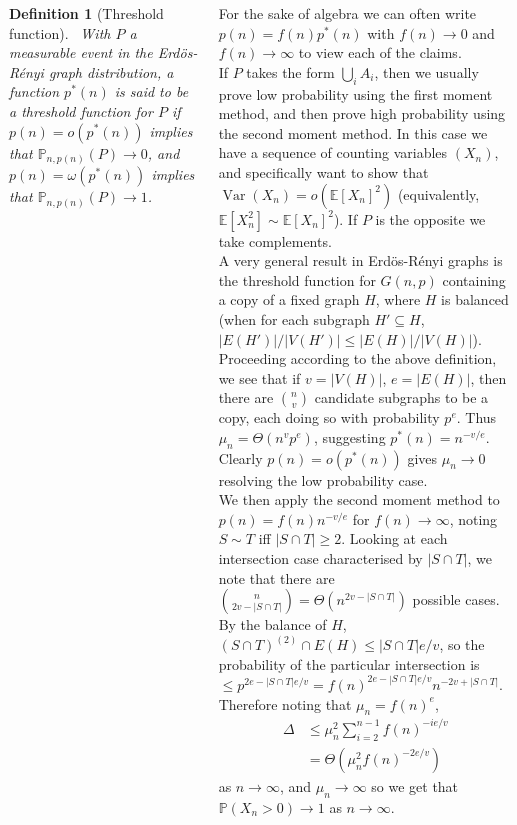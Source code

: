 \documentclass{tikzposter} %
\DeclareMathOperator{\Var}{Var}
\newcommand\Pj{\ensuremath{\mathbb{P}}}
\renewcommand\P[1]{\ensuremath{\mathbb{P}\left(#1\right)}}
\newcommand\E[1]{\ensuremath{\mathbb{E}\left[#1\right]}}
\newtheorem{definition}{Definition}
\begin{document}
\begin{columns}
{    \begin{definition}[Threshold function]
    \ With $P$ a measurable event in the Erd\"os-R\'enyi graph distribution, a function $p^*(n)$ is said to be a threshold function for $P$ if $p(n) = o(p^*(n))$ implies that $\Pj_{n, p(n)}\left(P\right) \to 0$, and $p(n) = \omega(p^*(n))$ implies that $\Pj_{n, p(n)}\left(P\right) \to 1$.
    \end{definition}
    \hphantom{}

    For the sake of algebra we can often write $p(n) = f(n) p^*(n)$ with $f(n) \to 0$ and $f(n) \to \infty$ to view each of the claims. \\

    If $P$ takes the form $\bigcup_i A_i$, then we usually prove low probability using the first moment method, and then prove high probability using the second moment method. In this case we have a sequence of counting variables $(X_n)$, and specifically want to show that $\Var(X_n) = o(\E{X_n}^2)$ (equivalently, $\E{X_n^2} \sim \E{X_n}^2$). If $P$ is the opposite we take complements. \\

    A very general result in Erd\"os-R\'enyi graphs is the threshold function for $G(n, p)$ containing a copy of a fixed graph $H$, where $H$ is balanced (when for each subgraph $H' \subseteq H$, $|E(H')|/|V(H')| \le |E(H)|/|V(H)|$). \\

    Proceeding according to the above definition, we see that if $v = |V(H)|$, $e = |E(H)|$, then there are ${n \choose v}$ candidate subgraphs to be a copy, each doing so with probability $p^e$. Thus $\mu_n = \Theta(n^v p^e)$, suggesting $p^*(n) = n^{-v/e}$. Clearly $p(n) = o(p^*(n))$ gives $\mu_n \to 0$ resolving the low probability case. \\

    We then apply the second moment method to $p(n) = f(n) n^{-v/e}$ for $f(n) \to \infty$, noting $S \sim T$ iff $|S \cap T| \ge 2$. Looking at each intersection case characterised by $|S \cap T|$, we note that there are ${n \choose 2v-|S \cap T|} = \Theta(n^{2v-|S \cap T|})$ possible cases. By the balance of $H$, $(S \cap T)^{(2)} \cap E(H) \le |S \cap T| e/v$, so the probability of the particular intersection is $\le p^{2e - |S \cap T| e/v} = f(n)^{2e - |S \cap T| e/v}n^{-2v + |S \cap T|}$. Therefore noting that $\mu_n = f(n)^e$,
    \begin{align*}
      \Delta &\le \mu_n^2\sum_{i = 2}^{n-1} f(n)^{-ie/v} \\
      &= \Theta(\mu^2_n f(n)^{-2e/v})
    \end{align*}
    as $n \to \infty$, and $\mu_n \to \infty$ so we get that $\P{X_n > 0} \to 1$ as $n \to \infty$. \\

}
\end{columns}
\end{document}
